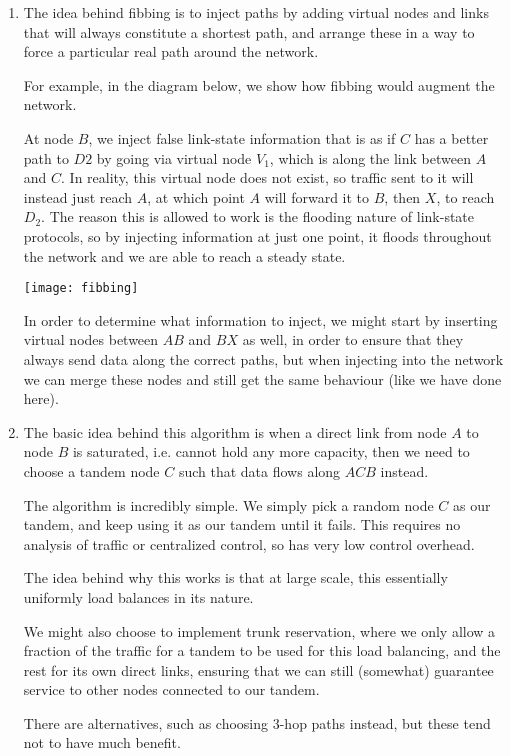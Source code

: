 


\begin{enumerate}[label=(\alph*)]
  \item
    The idea behind fibbing is to inject paths by adding virtual nodes and links that will always constitute a shortest path, and arrange these in a way to force a particular real path around the network.

    For example, in the diagram below, we show how fibbing would augment the network.

    At node $B$, we inject false link-state information that is as if $C$ has a better path to $D2$ by going via virtual node $V_1$, which is along the link between $A$ and $C$. In reality, this virtual node does not exist, so traffic sent to it will instead just reach $A$, at which point $A$ will forward it to $B$, then $X$, to reach $D_2$. The reason this is allowed to work is the flooding nature of link-state protocols, so by injecting information at just one point, it floods throughout the network and we are able to reach a steady state.

    \texttt{[image: fibbing]}

    In order to determine what information to inject, we might start by inserting virtual nodes between $AB$ and $BX$ as well, in order to ensure that they always send data along the correct paths, but when injecting into the network we can merge these nodes and still get the same behaviour (like we have done here).

  \item

    The basic idea behind this algorithm is when a direct link from node $A$ to node $B$ is saturated, i.e. cannot hold any more capacity, then we need to choose a tandem node $C$ such that data flows along $ACB$ instead.

    The algorithm is incredibly simple. We simply pick a random node $C$ as our tandem, and keep using it as our tandem until it fails. This requires no analysis of traffic or centralized control, so has very low control overhead.

    The idea behind why this works is that at large scale, this essentially uniformly load balances in its nature.

    We might also choose to implement trunk reservation, where we only allow a fraction of the traffic for a tandem to be used for this load balancing, and the rest for its own direct links, ensuring that we can still (somewhat) guarantee service to other nodes connected to our tandem.

    There are alternatives, such as choosing 3-hop paths instead, but these tend not to have much benefit. 


        
\end{enumerate}

